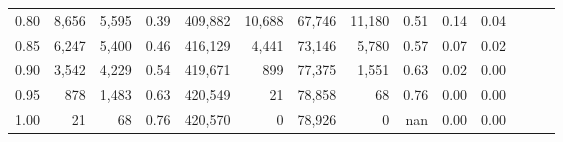 \begin{tabular}{rrrrrrrrrrrrrr}
0.80 &   8,656 &  5,595 &  0.39 &  409,882 &   10,688 &  67,746 &  11,180 &  0.51 &  0.14 &      0.04 \\
0.85 &   6,247 &  5,400 &  0.46 &  416,129 &    4,441 &  73,146 &   5,780 &  0.57 &  0.07 &      0.02 \\
0.90 &   3,542 &  4,229 &  0.54 &  419,671 &      899 &  77,375 &   1,551 &  0.63 &  0.02 &      0.00 \\
0.95 &     878 &  1,483 &  0.63 &  420,549 &       21 &  78,858 &      68 &  0.76 &  0.00 &      0.00 \\
1.00 &      21 &     68 &  0.76 &  420,570 &        0 &  78,926 &       0 &   nan &  0.00 &      0.00 \\
\bottomrule
\end{tabular}
